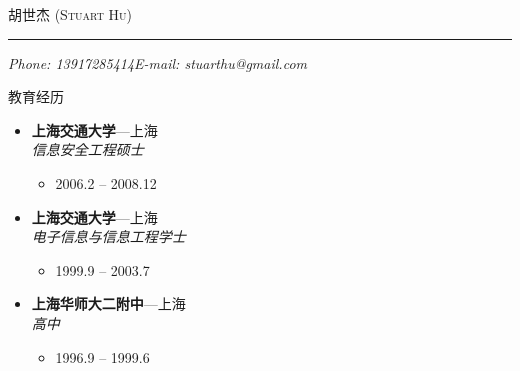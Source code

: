 \documentclass[11pt,oneside]{article}
\makeatletter
\newcommand{\name}{胡世杰 (Stuart Hu)}
\newcommand{\phone}{Phone: 13917285414}
\newcommand{\email}{E-mail: stuarthu@gmail.com}
\newcommand{\bigname}[1]{
    \begin{center}\selectfont\Huge\scshape#1\end{center}
}
\newenvironment{ressection}[1]{
    \vspace{4pt}
    {\selectfont\Large#1}
    \begin{itemize}
    \vspace{3pt}
}{
    \end{itemize}
}
\newcommand{\ressubitem}[1]{
    \vspace{-1pt}
    \item \begin{flushleft} #1 \end{flushleft}
}
\newcommand{\resbigitem}[3]{
    \vspace{-5pt}
    \item
    \textbf{#1}---#2 \\
    \textit{#3}
}
\newenvironment{ressubsec}[3]{
    \resbigitem{#1}{#2}{#3}
    \vspace{-2pt}
    \begin{itemize}
}{
    \end{itemize}
}
\makeatother
\begin{document}
\bigname{\name}

\vspace{-8pt} \rule{\textwidth}{1pt}

\vspace{-1pt} {\small\itshape \phone \hfill \email}

\vspace{8 pt}


\begin{ressection}{教育经历}

    \begin{ressubsec}{上海交通大学}{上海}{信息安全工程硕士}
        \ressubitem{2006.2 -- 2008.12}
    \end{ressubsec}

    \begin{ressubsec}{上海交通大学}{上海}{电子信息与信息工程学士}
        \ressubitem{1999.9 -- 2003.7}
    \end{ressubsec}

    \begin{ressubsec}{上海华师大二附中}{上海}{高中}
        \ressubitem{1996.9 -- 1999.6}
    \end{ressubsec}

\end{ressection}
\end{document}
